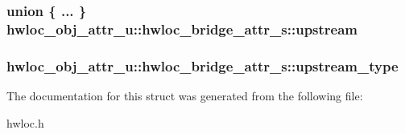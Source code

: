 \label{a00012_af3f3f7d76bf03e8d2afa721c2b8d6771}
\hypertarget{a00012_a00ce9d99fc8792d1044fe25dc58605fe}{
\subsubsection[{upstream}]{\setlength{\rightskip}{0pt plus 5cm}union \{ ... \}   {\bf hwloc\_\-obj\_\-attr\_\-u::hwloc\_\-bridge\_\-attr\_\-s::upstream}}}
\label{a00012_a00ce9d99fc8792d1044fe25dc58605fe}
\hypertarget{a00012_a265dd2164aa2df4972e25a029da72125}{
\subsubsection[{upstream\_\-type}]{ {\bf hwloc\_\-obj\_\-attr\_\-u::hwloc\_\-bridge\_\-attr\_\-s::upstream\_\-type}}}
\label{a00012_a265dd2164aa2df4972e25a029da72125}


The documentation for this struct was generated from the following file:\begin{DoxyCompactItemize}
\item 
hwloc.h\end{DoxyCompactItemize}
